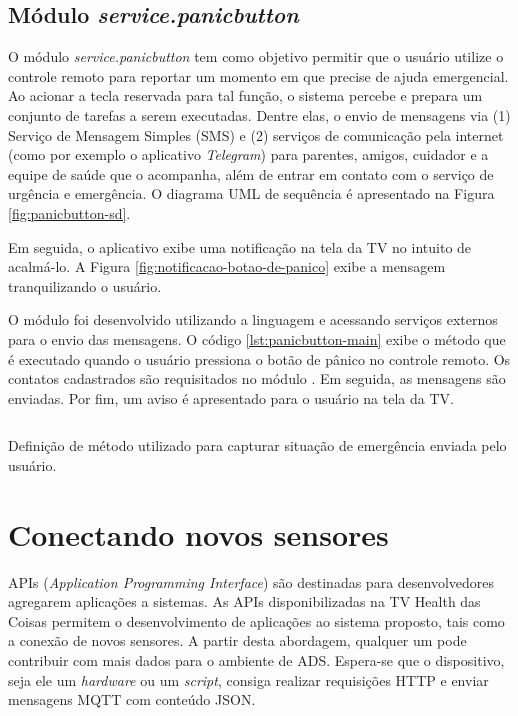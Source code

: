 \subsection{Módulo \textit{service.panicbutton}}\label{subsubsec:panicbutton}

O módulo \textit{service.panicbutton} tem como objetivo permitir que o usuário
utilize o controle remoto para reportar um momento em que precise de ajuda 
emergencial. Ao acionar a tecla reservada para tal função, o sistema percebe e
prepara um conjunto de tarefas a serem executadas. Dentre elas, o envio de 
mensagens via (1) Serviço de Mensagem Simples (SMS) e (2) serviços de comunicação
pela internet (como por exemplo o aplicativo \textit{Telegram}) para parentes, 
amigos, cuidador e a equipe de saúde que o acompanha, além de entrar em contato
com o serviço de urgência e emergência. O diagrama UML de sequência é apresentado
na Figura \ref{fig:panicbutton-sd}.


Em seguida, o aplicativo exibe uma notificação na tela da TV no intuito
de acalmá-lo. A Figura \ref{fig:notificacao-botao-de-panico} exibe a mensagem 
tranquilizando o usuário.

O módulo foi desenvolvido utilizando a linguagem \python[] e acessando serviços
externos para o envio das mensagens. O código \ref{lst:panicbutton-main} exibe
o método que é executado quando o usuário pressiona o botão de pânico no controle
remoto. Os contatos cadastrados são requisitados no módulo \web. Em seguida, as
mensagens são enviadas. Por fim, um aviso é apresentado para o usuário na tela
da TV.

\begin{listing}[ht!]
\inputminted{python}{codigos/panicbutton-main.py}
\caption{Definição de método utilizado para capturar situação de emergência enviada
pelo usuário.}
\label{lst:panicbutton-main}
\end{listing}

\section{Conectando novos sensores} \label{sec:conectando-novos-sensores}

APIs (\textit{Application Programming Interface}) são destinadas para desenvolvedores 
agregarem aplicações a sistemas. As APIs disponibilizadas na TV Health das Coisas 
permitem o desenvolvimento de aplicações ao sistema proposto, tais como a conexão
de novos sensores. A partir desta abordagem, qualquer um pode contribuir  com
mais dados para o ambiente de ADS. Espera-se que o
dispositivo, seja ele um \textit{hardware} ou um \textit{script}, consiga
realizar requisições HTTP e enviar mensagens MQTT com conteúdo JSON.

